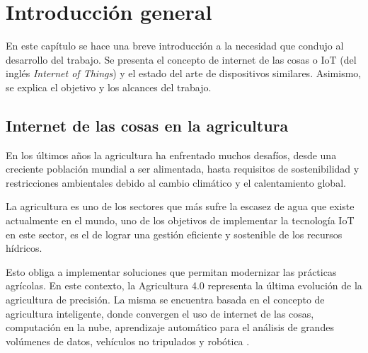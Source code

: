 
\chapter{Introducción general} %
En este capítulo se hace una breve introducción a la necesidad que condujo al desarrollo del trabajo. Se presenta el concepto de internet de las cosas o IoT (del inglés \textit{Internet of Things}) y el estado del arte de dispositivos similares. Asimismo, se explica el objetivo y los alcances del trabajo.
\label{Chapter1} %
\label{IntroGeneral}


\newcommand{\keyword}[1]{\textbf{#1}}
\newcommand{\tabhead}[1]{\textbf{#1}}
\newcommand{\code}[1]{\texttt{#1}}
\newcommand{\file}[1]{\texttt{\bfseries#1}}
\newcommand{\option}[1]{\texttt{\itshape#1}}
\newcommand{\grados}{$^{\circ}$}



\section{Internet de las cosas en la agricultura}
En los últimos años la agricultura ha enfrentado muchos desafíos, desde una creciente población mundial a ser alimentada, hasta requisitos de sostenibilidad y restricciones ambientales debido al cambio climático y el calentamiento global.

La agricultura es uno de los sectores que más sufre la escasez de agua que existe actualmente en el mundo, uno de los objetivos de implementar la tecnología IoT en este sector, es el de lograr una gestión eficiente y sostenible de los recursos hídricos.

Esto obliga a implementar soluciones que permitan modernizar las prácticas agrícolas. En este contexto, la Agricultura 4.0 representa la última evolución de la  agricultura de precisión. La misma se encuentra basada en el concepto de agricultura inteligente, donde convergen el uso de internet de las cosas, computación
en la nube, aprendizaje automático para el análisis de grandes volúmenes de datos, vehículos no tripulados y robótica \citep{Agriculture4.0}.


